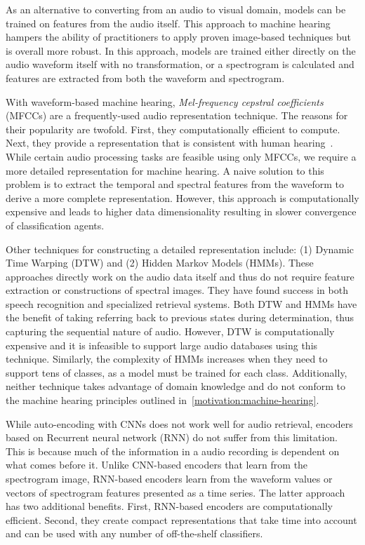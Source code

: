 As an alternative to converting from an audio to visual domain, models can be trained on features from the audio itself. This approach to machine hearing hampers the ability of practitioners to apply proven image-based techniques but is overall more robust. In this approach, models are trained either directly on the audio waveform itself with no transformation, or a spectrogram is calculated and features are extracted from both the waveform and spectrogram.

With waveform-based machine hearing, \textit{Mel-frequency cepstral
coefficients} (MFCCs) are a frequently-used audio representation technique. 
The reasons for their popularity are twofold. First, they computationally
efficient to compute. Next, they provide a representation that is consistent
with human hearing~\cite{kaur-feature-2015}.
While certain audio processing tasks are feasible using only MFCCs, we require 
a more detailed representation for machine hearing.
A naive solution to this problem is to extract the temporal and spectral
features from the waveform to derive a more complete representation.
However, this approach is computationally expensive and leads to higher data
dimensionality resulting in slower convergence of classification agents.

Other techniques for constructing a detailed representation include: (1) 
Dynamic Time Warping (DTW) and (2) Hidden Markov Models (HMMs).
These approaches directly work on the audio data itself and thus do not require
feature extraction or constructions of spectral images.
They have found success in both speech recognition and specialized retrieval
systems.
Both DTW and HMMs have the benefit of taking referring back to previous states during determination, thus capturing the sequential nature 
of audio. 
However, DTW is computationally expensive and it is infeasible to support 
large audio databases using this technique.
Similarly, the complexity of HMMs increases when they need to support tens of
classes, as a model must be trained for each class.
Additionally, neither technique takes advantage of domain knowledge 
and do not conform to the machine hearing principles outlined
in~\cref{motivation:machine-hearing}.

While auto-encoding with CNNs does not work well for audio retrieval,
encoders based on Recurrent neural network (RNN) do not suffer from this
limitation.
This is because much of the information in a audio recording is dependent 
on what comes before it.
Unlike CNN-based encoders that learn from the spectrogram image,
RNN-based encoders learn from the waveform values or vectors of spectrogram
features presented as a time series.
The latter approach has two additional benefits.
First, RNN-based encoders are computationally efficient.
Second, they create compact representations that take time into account 
and can be used with any number of off-the-shelf classifiers.


